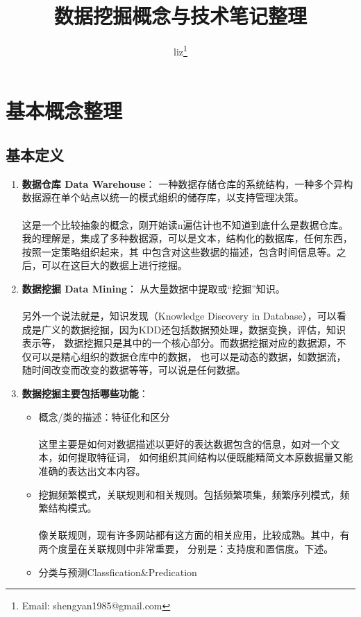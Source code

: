 \documentclass[a4paper,10pt,english]{article}
\title{数据挖掘概念与技术笔记整理}
\author{liz\footnote{Email: shengyan1985@gmail.com}}
\begin{document}
\maketitle
\tableofcontents

\section{基本概念整理}
\subsection{基本定义}
\begin{enumerate}
\item
\textbf{数据仓库 Data Warehouse}：
一种数据存储仓库的系统结构，一种多个异构数据源在单个站点以统一的模式组织的储存库，以支持管理决策。
\paragraph{}
这是一个比较抽象的概念，刚开始读n遍估计也不知道到底什么是数据仓库。
我的理解是，集成了多种数据源，可以是文本，结构化的数据库，任何东西，按照一定策略组织起来，其
中包含对这些数据的描述，包含时间信息等。之后，可以在这巨大的数据上进行挖掘。

\item
\textbf{数据挖掘 Data Mining}： 从大量数据中提取或“挖掘”知识。
\paragraph{}
另外一个说法就是，知识发现（Knowledge Discovery in
Database），可以看成是广义的数据挖掘，因为KDD还包括数据预处理，数据变换，评估，知识表示等，
数据挖掘只是其中的一个核心部分。而数据挖掘对应的数据源，不仅可以是精心组织的数据仓库中的数据，
也可以是动态的数据，如数据流，随时间改变而改变的数据等等，可以说是任何数据。

\item
\textbf{数据挖掘主要包括哪些功能}：
\begin{itemize}
\item
概念/类的描述：特征化和区分
\paragraph{}
这里主要是如何对数据描述以更好的表达数据包含的信息，如对一个文本，如何提取特征词，
如何组织其间结构以便既能精简文本原数据量又能准确的表达出文本内容。
\item
挖掘频繁模式，关联规则和相关规则。包括频繁项集，频繁序列模式，频繁结构模式。
\paragraph{}
像关联规则，现有许多网站都有这方面的相关应用，比较成熟。其中，有两个度量在关联规则中非常重要，
分别是：支持度和置信度。下述。
\item
分类与预测Classfication\&Predication

\end{itemize}
\end{enumerate}
\end{document}
